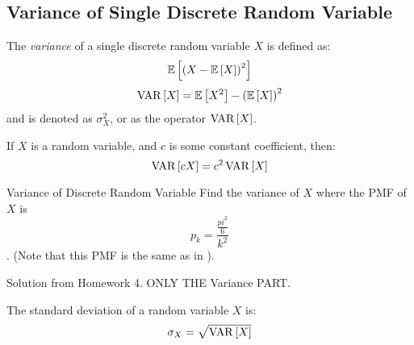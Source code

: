 	\subsection{Variance of Single Discrete Random Variable} \label{subsec:Variance of Single Discrete}
		\begin{definition}[Variance] \label{def:Variance of Single Discrete}
			The \emph{variance} of a single discrete random variable $X$ is defined as:
			\begin{equation} \label{eq:Variance of Single Discrete-Form 1}
				\operatorname{\operatorname{\mathbb{E}}} \left[ \left( X - \operatorname{\operatorname{\mathbb{E}}} \left[ X \right] \right)^{2} \right]
			\end{equation}
			\begin{equation} \label{eq:Variance of Single Discrete-Form 2}
				\operatorname{\operatorname{VAR}} \left[ X \right] = \operatorname{\operatorname{\mathbb{E}}} \left[ X^{2} \right] - \left( \operatorname{\operatorname{\mathbb{E}}} \left[ X \right] \right)^{2}
			\end{equation}
			and is denoted as $\sigma_{X}^{2}$, or as the operator $\operatorname{\operatorname{VAR}} \left[ X \right]$.
			\begin{remark} \label{rmk:Constant in Variance}
				If $X$ is a random variable, and $c$ is some constant coefficient, then:
				\begin{equation}
					\operatorname{\operatorname{VAR}} \left[ cX \right] = c^{2} \operatorname{\operatorname{VAR}} \left[ X \right]
				\end{equation}
			\end{remark}
		\end{definition}
		\begin{example}[Problem 3.27]{Variance of Discrete Random Variable}
			Find the variance of $X$ where the PMF of $X$ is \[p_{k} = \frac{\frac{pi^{2}}{6}}{k^{2}}\]. (Note that this PMF is the same as in ).
			
			\tcblower
			
			Solution from Homework 4. ONLY THE Variance PART.
		\end{example}
		\begin{definition} \label{def:Standard Deviation}
			The standard deviation of a random variable $X$ is:
			\begin{equation} \label{eq:Standard Deviation}
				\sigma_{X} = \sqrt{\operatorname{\operatorname{VAR}} \left[ X \right]}
			\end{equation}
		\end{definition}
	
